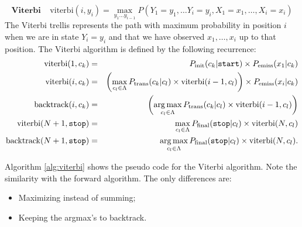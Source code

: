\begin{equation}
\label{eq::viterbi}
\mathbf{Viterbi }\;\;\;\;  \mathrm{viterbi}(i, y_i) = \max_{y_1...y_{i-1}} P(Y_1=y_1,\ldots Y_i = y_i , X_1=x_1,\ldots, X_i=x_i)
\end{equation}
The Viterbi trellis represents the path with maximum probability in
position
$i$ when we are in state $Y_i=y_i$ and that we have observed $x_1,\ldots,x_i$
up to that position. The Viterbi algorithm is defined by the
following recurrence: 
\begin{eqnarray}
\mathrm{viterbi}(1, c_k) &=& P_{\mathrm{init}}(c_k|\text{\tt start}) \times 
P_{\mathrm{emiss}}(x_1 | c_k)
 \\
 \mathrm{viterbi}(i, c_k) &=& \left( \displaystyle \max_{c_l \in \Lambda} P_{\mathrm{trans}}(c_k | c_l) \times \mathrm{viterbi}(i-1, c_l) \right) \times P_{\mathrm{emiss}}(x_i | c_k)  \label{viterbiRecursion}
 \\
 \mathrm{backtrack}(i, c_k) &=& \left( \displaystyle \operatorname*{arg\,max}_{c_l \in \Lambda} P_{\mathrm{trans}}(c_k | c_l) \times \mathrm{viterbi}(i-1, c_l) \right) 
 \\
  \mathrm{viterbi}(N+1, \text{\tt stop}) &=& \max_{c_l \in \Lambda} P_{\mathrm{final}}(\text{\tt stop} | c_l) \times \mathrm{viterbi}(N, c_l)
 \\
  \mathrm{backtrack}(N+1, \text{\tt stop}) &=& \operatorname*{arg\,max}_{c_l \in \Lambda} P_{\mathrm{final}}(\text{\tt stop} | c_l) \times \mathrm{viterbi}(N, c_l).
\end{eqnarray}



Algorithm \ref{alg:viterbi} shows the pseudo code for the Viterbi algorithm.
Note the similarity with the forward algorithm.
The only differences are:
\begin{itemize}
\item Maximizing instead of summing;
\item Keeping the argmax's to backtrack.
\end{itemize}

